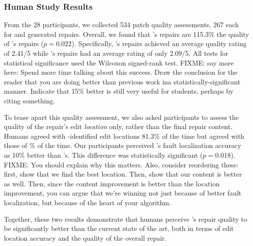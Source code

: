\subsubsection{Human Study Results}
\label{subsubsec:study_res}


From the 28 participants, we collected 534 patch quality assessments, 267 each
for \toolname and \seminal generated repairs. Overall, we found that \toolname's
repairs are 115.3\% the quality of \seminal's repairs ($p=0.022$). Specifically,
\toolname's repairs achieved an average quality rating of 2.41/5 while
\seminal's repairs had an average rating of only 2.09/5. All tests for
statistical significance used the Wilcoxon signed-rank test. FIXME: say
more here: Spend more time talking about this success. Draw the conclusion
for the reader that you are doing better than previous work ina
statistically-significant manner. Indicate that 15\% better is still very
useful for students, perhaps by citing something.

To tease apart this quality assessment, we also asked participants to assess
the quality of the repair's edit \emph{location} only,
rather than the final repair content.
Humans agreed with \toolname-identified edit locations 81.3\%
of the time but agreed with those of \% of the time.
Our participants perceived \toolname's fault localization accuracy
as 10\% better than \seminal's. This difference was statistically significant
($p=0.018$). FIXME: You should explain why this matters. Also, consider
reordering these: first, show that we find the best location. Then, show
that our content is better as well. Then, since the content improvement is
better than the location improvement, you can argue that we're winning not
just because of better fault localization, but because of the heart of your
algorithm.


Together, these two results demonstrate that humans perceive \toolname's repair
quality to be significantly better than the current state of the art, both in
terms of edit location accuracy and the quality of the overall repair.
